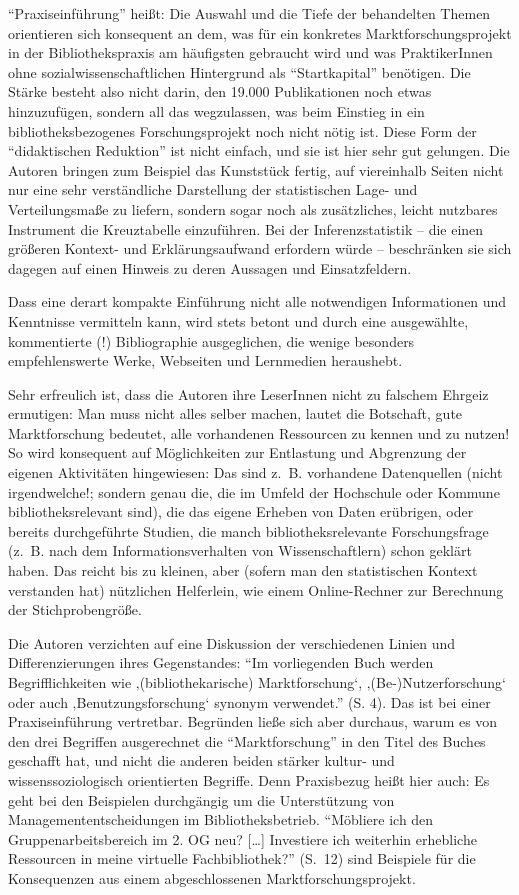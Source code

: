 \documentclass[a4paper,
fontsize=11pt,
oneside,
numbers=noperiodatend,
parskip=half-,
bibliography=totoc,
final
]{scrartcl}
\begin{document}
\enquote{Praxiseinführung} heißt: Die Auswahl und die Tiefe der
behandelten Themen orientieren sich konsequent an dem, was für ein
konkretes Marktforschungsprojekt in der Bibliothekspraxis am häufigsten
gebraucht wird und was PraktikerInnen ohne sozialwissenschaftlichen
Hintergrund als \enquote{Startkapital} benötigen. Die Stärke besteht
also nicht darin, den 19.000 Publikationen noch etwas hinzuzufügen,
sondern all das wegzulassen, was beim Einstieg in ein
bibliotheksbezogenes Forschungsprojekt noch nicht nötig ist. Diese Form
der \enquote{didaktischen Reduktion} ist nicht einfach, und sie ist hier
sehr gut gelungen. Die Autoren bringen zum Beispiel das Kunststück
fertig, auf viereinhalb Seiten nicht nur eine sehr verständliche
Darstellung der statistischen Lage- und Verteilungsmaße zu liefern,
sondern sogar noch als zusätzliches, leicht nutzbares Instrument die
Kreuztabelle einzuführen. Bei der Inferenzstatistik -- die einen
größeren Kontext- und Erklärungsaufwand erfordern würde -- beschränken
sie sich dagegen auf einen Hinweis zu deren Aussagen und
Einsatzfeldern.~

Dass eine derart kompakte Einführung nicht alle notwendigen
Informationen und Kenntnisse vermitteln kann, wird stets betont und
durch eine ausgewählte, kommentierte (!) Bibliographie ausgeglichen, die
wenige besonders empfehlenswerte Werke, Webseiten und Lernmedien
heraushebt.

Sehr erfreulich ist, dass die Autoren ihre LeserInnen nicht zu falschem
Ehrgeiz ermutigen: Man muss nicht alles selber machen, lautet die
Botschaft, gute Marktforschung bedeutet, alle vorhandenen Ressourcen zu
kennen und zu nutzen! So wird konsequent auf Möglichkeiten zur
Entlastung und Abgrenzung der eigenen Aktivitäten hingewiesen: Das sind
z.~B. vorhandene Datenquellen (nicht irgendwelche!; sondern genau die,
die im Umfeld der Hochschule oder Kommune bibliotheksrelevant sind), die
das eigene Erheben von Daten erübrigen, oder bereits durchgeführte
Studien, die manch bibliotheksrelevante Forschungsfrage (z.~B. nach dem
Informationsverhalten von Wissenschaftlern) schon geklärt haben. Das
reicht bis zu kleinen, aber (sofern man den statistischen Kontext
verstanden hat) nützlichen Helferlein, wie einem Online-Rechner zur
Berechnung der Stichprobengröße.~

Die Autoren verzichten auf eine Diskussion der verschiedenen Linien und
Differenzierungen ihres Gegenstandes: \enquote{Im vorliegenden Buch
werden Begrifflichkeiten wie ‚(bibliothekarische) Marktforschung`,
‚(Be-)Nutzerforschung` oder auch ‚Benutzungsforschung` synonym
verwendet.} (S. 4). Das ist bei einer Praxiseinführung vertretbar.
Begründen ließe sich aber durchaus, warum es von den drei Begriffen
ausgerechnet die \enquote{Marktforschung} in den Titel des Buches
geschafft hat, und nicht die anderen beiden stärker kultur- und
wissenssoziologisch orientierten Begriffe. Denn Praxisbezug heißt hier
auch: Es geht bei den Beispielen durchgängig um die Unterstützung von
Managemententscheidungen im Bibliotheksbetrieb. \enquote{Möbliere ich
den Gruppenarbeitsbereich im 2. OG neu? {[}\ldots{}{]} Investiere ich
weiterhin erhebliche Ressourcen in meine virtuelle Fachbibliothek?}
(S.~12) sind Beispiele für die Konsequenzen aus einem abgeschlossenen
Marktforschungsprojekt.~
\end{document}
